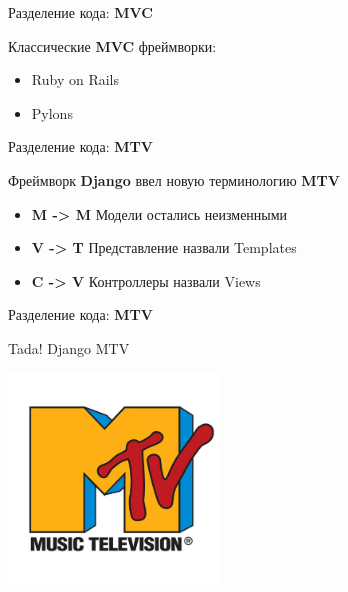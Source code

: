 \begin{frame}{Разделение кода: \textbf{MVC}}

  Классические \textbf{MVC} фреймворки:

  \begin{itemize}
    \item Ruby on Rails
    \item Pylons
  \end{itemize}

\end{frame}


\begin{frame}{Разделение кода: \textbf{MTV}}

  Фреймворк \textbf{Django} ввел новую терминологию \textbf{MTV}

  \begin{itemize}
    \item \textbf{M -> M} Модели остались неизменными
    \item \textbf{V -> T} Представление назвали Templates
    \item \textbf{C -> V} Контроллеры назвали Views
  \end{itemize}

\end{frame}


\begin{frame}{Разделение кода: \textbf{MTV}}

  Tada! Django MTV

  \begin{center}
    \includegraphics[width=2.2in]{media/mtv_logo.jpg}
  \end{center}

\end{frame}

